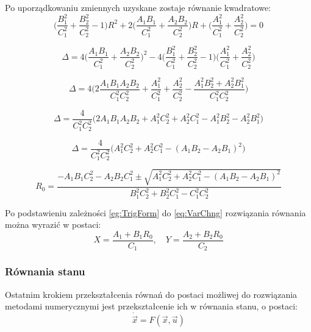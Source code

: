 \documentclass[10pt]{article}
\begin{document}
Po uporządkowaniu zmiennych uzyskane zostaje równanie kwadratowe:
\begin{equation}
\Bigg( \frac{B_1^2}{C_1^2} + \frac{B_2^2}{C_2^2} - 1 \Bigg) R^2 +
2 \Bigg( \frac{A_1B_1}{C_1^2} + \frac{A_2B_2}{C_2^2} \Bigg) R +
\Bigg( \frac{A_1^2}{C_1^2} + \frac{A_2^2}{C_2^2} \Bigg) = 0
\end{equation}

\begin{equation}
\Delta = 4 \Bigg( \frac{A_1B_1}{C_1^2} + \frac{A_2B_2}{C_2^2} \Bigg)^2 -
4 \Bigg( \frac{B_1^2}{C_1^2} + \frac{B_2^2}{C_2^2} - 1 \Bigg)
\Bigg( \frac{A_1^2}{C_1^2} + \frac{A_2^2}{C_2^2} \Bigg)
\end{equation}

\begin{equation}
\Delta = 4 \Bigg(2
\frac{A_1 B_1 A_2 B_2}{C_1^2 C_2^2} +
\frac{A_1^2}{C_1^2} +
\frac{A_2^2}{C_2^2} -
\frac{A_1^2 B_2^2 + A_2^2 B_1^2}{C_1^2 C_2^2} 
\Bigg)
\end{equation}

\begin{equation}
\Delta = \frac{4}{C_1^2C_2^2}
\Big( 2A_1B_1A_2B_2 + A_1^2C_2^2 + A_2^2C_1^2 - A_1^2B_2^2 - A_2^2B_1^2 \Big)
\end{equation}

\begin{equation}
\Delta = \frac{4}{C_1^2C_2^2}
\Big( A_1^2C_2^2 + A_2^2C_1^2 - ( A_1B_2 - A_2B_1)^2 \Big)
\end{equation}

\begin{equation}
R_0 = \frac{-A_1B_1C_2^2 -A_2B_2C_1^2 \pm
\sqrt{A_1^2C_2^2 + A_2^2C_1^2 - ( A_1B_2 - A_2B_1)^2}}
{B_1^2C_2^2 + B_2^2C_1^2 - C_1^2C_2^2}
\end{equation}

Po podstawieniu zależności \eqref{eg:TrigForm} do \eqref{eq:VarChng} rozwiązania równania można wyrazić w postaci:
\begin{equation}
X = \frac{A_1 + B_1 R_0}{C_1}, \quad
Y = \frac{A_2 + B_2 R_0}{C_2}
\end{equation}
 
\newpage
\subsubsection*{Równania stanu}
Ostatnim krokiem przekształcenia równań do postaci możliwej do rozwiązania metodami numerycznymi jest przekształcenie ich w równania stanu, o postaci:
\begin{equation}
\dot{\vec{x}} = F(\vec{x}, \vec{u})
\end{equation}
\end{document}
